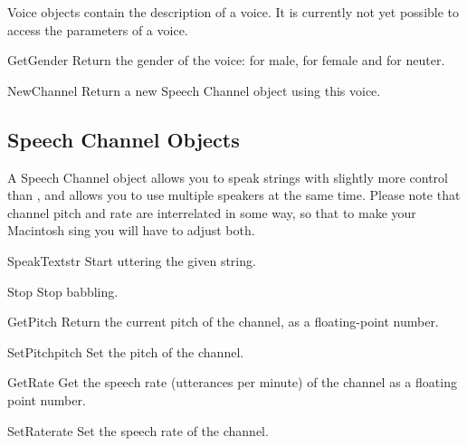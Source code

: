 Voice objects contain the description of a voice. It is currently not
yet possible to access the parameters of a voice.


\begin{methoddesc}[Voice]{GetGender}{}
Return the gender of the voice:  for male,  for female
and  for neuter.
\end{methoddesc}

\begin{methoddesc}[Voice]{NewChannel}{}
Return a new Speech Channel object using this voice.
\end{methoddesc}

\subsection{Speech Channel Objects}
\label{speech-channel-objects}

A Speech Channel object allows you to speak strings with slightly more
control than , and allows you to use multiple
speakers at the same time. Please note that channel pitch and rate are
interrelated in some way, so that to make your Macintosh sing you will
have to adjust both.

\begin{methoddesc}{SpeakText}{str}
Start uttering the given string.
\end{methoddesc}

\begin{methoddesc}{Stop}{}
Stop babbling.
\end{methoddesc}

\begin{methoddesc}{GetPitch}{}
Return the current pitch of the channel, as a floating-point number.
\end{methoddesc}

\begin{methoddesc}{SetPitch}{pitch}
Set the pitch of the channel.
\end{methoddesc}

\begin{methoddesc}{GetRate}{}
Get the speech rate (utterances per minute) of the channel as a
floating point number.
\end{methoddesc}

\begin{methoddesc}{SetRate}{rate}
Set the speech rate of the channel.
\end{methoddesc}

